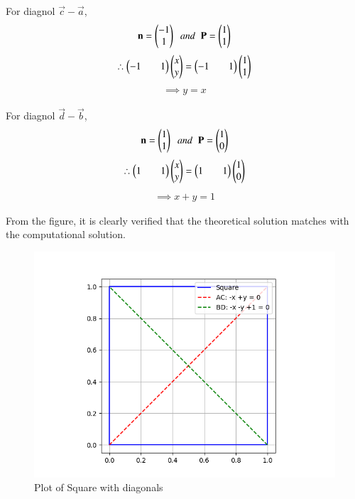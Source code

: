 \documentclass[journal]{IEEEtran}
\begin{document}
\newpage
\vspace*{0.25cm}
For diagnol $\vec{c}-\vec{a}$,
\begin{align*}
    \mathbf{n}=\begin{pmatrix}-1\\1\end{pmatrix}\;\;and\;\;\mathbf{P}=\begin{pmatrix}1\\1\end{pmatrix}
\end{align*}
\begin{align*}
    \therefore \begin{pmatrix}-1&&1\end{pmatrix}\begin{pmatrix}x\\y\end{pmatrix}=\begin{pmatrix}-1&&1\end{pmatrix}\begin{pmatrix}1\\1\end{pmatrix}
\end{align*}
\begin{align*}
    \implies y=x
\end{align*}

For diagnol $\vec{d}-\vec{b}$,
\begin{align*}
    \mathbf{n}=\begin{pmatrix}1\\1\end{pmatrix}\;\;and\;\;\mathbf{P}=\begin{pmatrix}1\\0\end{pmatrix}
\end{align*}
\begin{align*}
    \therefore \begin{pmatrix}1&&1\end{pmatrix}\begin{pmatrix}x\\y\end{pmatrix}=\begin{pmatrix}1&&1\end{pmatrix}\begin{pmatrix}1\\0\end{pmatrix}
\end{align*}
\begin{align*}
    \implies x+y=1
\end{align*}

From the figure, it is clearly verified that the theoretical solution matches with the computational solution.\\
\begin{figure}[H]
    \centering
    \includegraphics[width=0.6\columnwidth]{figs/Figure_1.png}
    \caption*{Plot of Square with diagonals}
    \label{fig:1}
\end{figure}
\end{document}
